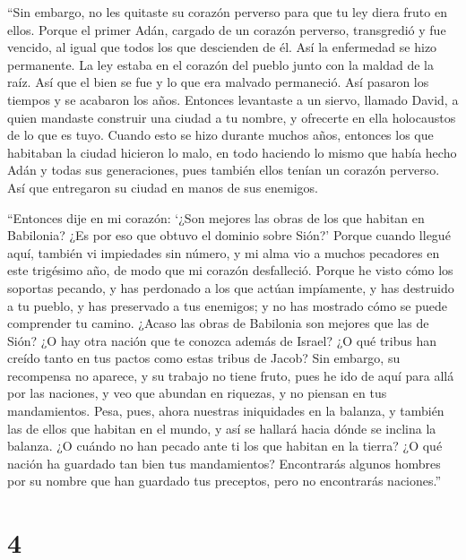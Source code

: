 ``Sin embargo, no les quitaste su corazón perverso para
que tu ley diera fruto en ellos.  Porque el primer Adán,
cargado de un corazón perverso, transgredió y fue vencido, al igual que
todos los que descienden de él.  Así la enfermedad se
hizo permanente. La ley estaba en el corazón del pueblo junto con la
maldad de la raíz. Así que el bien se fue y lo que era malvado
permaneció.  Así pasaron los tiempos y se acabaron los
años. Entonces levantaste a un siervo, llamado David,  a
quien mandaste construir una ciudad a tu nombre, y ofrecerte en ella
holocaustos de lo que es tuyo.  Cuando esto se hizo
durante muchos años, entonces los que habitaban la ciudad hicieron lo
malo,  en todo haciendo lo mismo que había hecho Adán y
todas sus generaciones, pues también ellos tenían un corazón perverso.
 Así que entregaron su ciudad en manos de sus enemigos.

 ``Entonces dije en mi corazón: `¿Son mejores las obras
de los que habitan en Babilonia? ¿Es por eso que obtuvo el dominio sobre
Sión?'  Porque cuando llegué aquí, también vi impiedades
sin número, y mi alma vio a muchos pecadores en este trigésimo año, de
modo que mi corazón desfalleció.  Porque he visto cómo
los soportas pecando, y has perdonado a los que actúan impíamente, y has
destruido a tu pueblo, y has preservado a tus enemigos; 
y no has mostrado cómo se puede comprender tu camino. ¿Acaso las obras
de Babilonia son mejores que las de Sión?  ¿O hay otra
nación que te conozca además de Israel? ¿O qué tribus han creído tanto
en tus pactos como estas tribus de Jacob?  Sin embargo,
su recompensa no aparece, y su trabajo no tiene fruto, pues he ido de
aquí para allá por las naciones, y veo que abundan en riquezas, y no
piensan en tus mandamientos.  Pesa, pues, ahora nuestras
iniquidades en la balanza, y también las de ellos que habitan en el
mundo, y así se hallará hacia dónde se inclina la balanza.
 ¿O cuándo no han pecado ante ti los que habitan en la
tierra? ¿O qué nación ha guardado tan bien tus mandamientos?
 Encontrarás algunos hombres por su nombre que han
guardado tus preceptos, pero no encontrarás naciones.''

\hypertarget{section-3}{%
\section{4}\label{section-3}}

